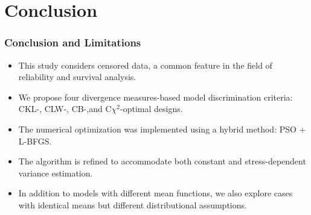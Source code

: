 \documentclass[xcolor=dvipsnames,aspectratio=1610]{beamer}
\begin{document}
\section{Conclusion}
\begin{frame}
\frametitle{Conclusion and Limitations}

\begin{itemize}
\item This study considers censored data, a common feature in the field of reliability and survival analysis.
\item We propose four divergence measures-based model discrimination criteria:
CKL-, CLW-, CB-,and C$\chi^2$-optimal designs.
\item The numerical optimization was implemented using a hybrid method: PSO + L-BFGS.
\item The algorithm is refined to accommodate both constant and stress-dependent variance estimation.
\item In addition to models with different mean functions, we also explore cases with identical means but different distributional assumptions.
\end{itemize}
\end{frame}


\end{document}
